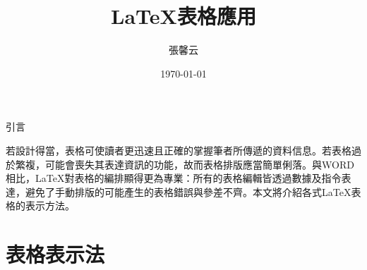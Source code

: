   

\title{ \LaTeX{\UD 表格應用}}
\author{{\NC 張馨云}\;\; {}}
\date{{\BR \today}} 	


\maketitle
\fontsize{12}{22 pt}\selectfont

\centerline{{\BCF 引言}}
\setlength{\parindent}{2em}   
	若設計得當，表格可使讀者更迅速且正確的掌握筆者所傳遞的資料信息。若表格過於繁複，可能會喪失其表達資訊的功能，故而表格排版應當簡單俐落。與WORD相比，\LaTeX 對表格的編排顯得更為專業：所有的表格編輯皆透過數據及指令表達，避免了手動排版的可能產生的表格錯誤與參差不齊。本文將介紹各式\LaTeX 表格的表示方法。
\bigskip
\section{{\BM 表格表示法}}
